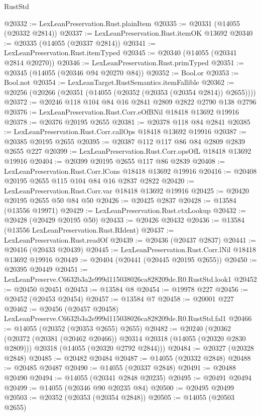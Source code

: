 \begin{lexlean}{RustStd}
\begin{coremodule}
@20332 := LexLeanPreservation.Rust.plainItem
@20335 := @20331 (@14055 (@20332 @2814))
@20337 := LexLeanPreservation.Rust.itemOK @13692
@20340 := @20335 (@14055 (@20337 @2814))
@20341 := LexLeanPreservation.Rust.itemTyped
@20345 := @20340 (@14055 (@20341 @2814 @20270))
@20346 := LexLeanPreservation.Rust.primTyped
@20351 := @20345 (@14055 (@20346 @94 @20270 @84))
@20352 := Bool.or
@20353 := Bool.not
@20354 := LexLeanTarget.RustSemantics.itemFallible
@20362 := @20256 (@20266 (@20351 (@14055 (@20352 (@20353 (@20354 @2814)) @2655))))
@20372 := @20246 @118 @104 @84 @16 @2841 @2809 @2822 @2790 @138 @2796
@20376 := LexLeanPreservation.Rust.Corr.eOfBNil @18418 @13692 @19916
@20378 := @20376 @20195 @2655
@20381 := @20378 @118 @84 @2841
@20385 := LexLeanPreservation.Rust.Corr.callOps @18418 @13692 @19916
@20387 := @20385 @20195 @2655
@20395 := @20387 @112 @117 @86 @84 @2809 @2839 @2655 @227
@20399 := LexLeanPreservation.Rust.Corr.opsOfL @18418 @13692 @19916
@20404 := @20399 @20195 @2655 @117 @86 @2839
@20408 := LexLeanPreservation.Rust.Corr.lCons @18418 @13692 @19916
@20416 := @20408 @20195 @2655 @115 @104 @84 @16 @2837 @2822
@20420 := LexLeanPreservation.Rust.Corr.var @18418 @13692 @19916
@20425 := @20420 @20195 @2655 @50 @84 @50
@20426 := @20425 @2837
@20428 := @13584 (@13556 @19971)
@20429 := LexLeanPreservation.Rust.ctxLookup
@20432 := @20428 (@20429 @20195 @50)
@20433 := @20426 @20432
@20436 := @13584 (@13556 LexLeanPreservation.Rust.RIdent)
@20437 := LexLeanPreservation.Rust.readOf
@20439 := @20436 (@20437 @2837)
@20441 := @20416 (@20433 @20439)
@20445 := LexLeanPreservation.Rust.Corr.lNil @18418 @13692 @19916
@20449 := @20404 (@20441 (@20445 @20195 @2655))
@20450 := @20395 @20449
@20451 := LexLeanPreserve.C6632b3a2e999d115038026ca828209de.R0.RustStd.look1
@20452 := @20450 @20451
@20453 := @13584 @8
@20454 := @19978 @227
@20456 := @20452 (@20453 @20454)
@20457 := @13584 @7
@20458 := @20001 @227
@20462 := @20456 (@20457 @20458) LexLeanPreserve.C6632b3a2e999d115038026ca828209de.R0.RustStd.fal1
@20466 := @14055 (@20352 (@20353 @2655) @2655)
@20482 := @20240
    (@20362
      (@20372 (@20381 (@20462 @20466)) @20314 @20318 (@14055 (@20320 @2830 @2809)))
      @20318
      (@14055 (@20320 @2792 @2844)))
@20484 := @20327 (@20328 @2848)
@20485 := @20482 @20484
@20487 := @14055 (@20332 @2848)
@20488 := @20485 @20487
@20490 := @14055 (@20337 @2848)
@20491 := @20488 @20490
@20494 := @14055 (@20341 @2848 @20235)
@20495 := @20491 @20494
@20499 := @14055 (@20346 @90 @20235 @84)
@20500 := @20495 @20499
@20503 := @20352 (@20353 (@20354 @2848))
@20505 := @14055 (@20503 @2655)

\end{coremodule}
\end{lexlean}
